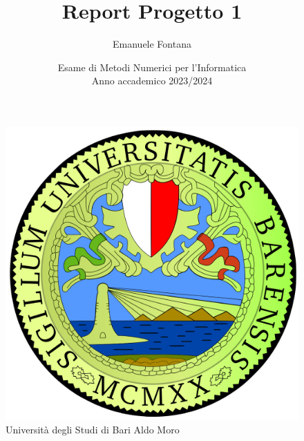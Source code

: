 \documentclass[12pt]{article}
\begin{document}

    \pagestyle{fancy}
    \everymath{\displaystyle}
    \sffamily
    \begin{figure}
        \centering
        \includegraphics[scale=0.1]{images/uniba-logo.png}
        \caption*{Università degli Studi di Bari Aldo Moro}
    \end{figure}
    
    \title{Report Progetto 1}
    \author{Emanuele Fontana}
    \date{Esame di Metodi Numerici per l'Informatica \\Anno accademico 2023/2024}
    \maketitle
    \tableofcontents\newpage
    \newpage
    
    \newpage
    
    \newpage
    
    \newpage
    
    \newpage
    
    \newpage
    
    \newpage
    
\end{document}
